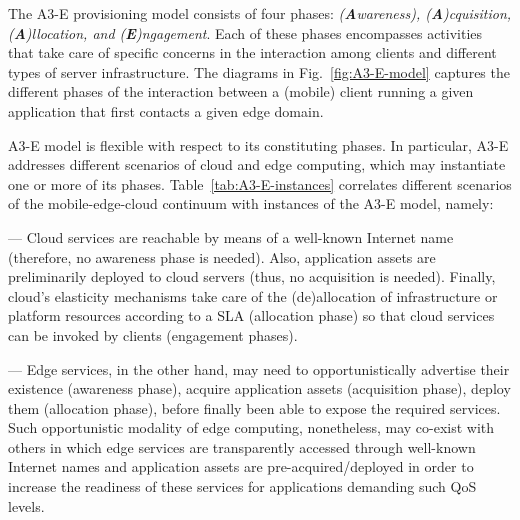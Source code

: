 

The A3-E provisioning model consists of four phases: \textit{(\textbf{A}wareness), (\textbf{A})cquisition, (\textbf{A})llocation, and (\textbf{E})ngagement}. Each of these phases encompasses activities that take care of specific concerns in the interaction among clients and different types of server infrastructure. %
The diagrams in Fig.~\ref{fig:A3-E-model} captures the different phases of the interaction between a (mobile) client running a given application that first contacts a given edge domain. 

A3-E model is flexible with respect to its constituting phases. In particular, A3-E  addresses different scenarios of cloud and edge computing, which may instantiate one or more of its phases. Table~\ref{tab:A3-E-instances} correlates different scenarios of the mobile-edge-cloud continuum with instances of the A3-E model, namely:



--- Cloud services are reachable by means of a well-known Internet name (therefore, no awareness phase is needed). Also, application assets are preliminarily deployed to cloud servers (thus, no acquisition is needed). Finally, cloud's elasticity mechanisms take care of the (de)allocation of infrastructure or platform resources according to a SLA (allocation phase) so that cloud services can be invoked by clients (engagement phases). 

--- Edge services, in the other hand, may need to opportunistically advertise their existence (awareness phase), acquire application assets (acquisition phase), deploy them (allocation phase), before finally been able to expose the required services. Such opportunistic modality of edge computing, nonetheless, may co-exist with others in which edge services are transparently accessed through well-known Internet names and application assets are pre-acquired/deployed in order to increase the readiness of these services for applications demanding such QoS levels. 

